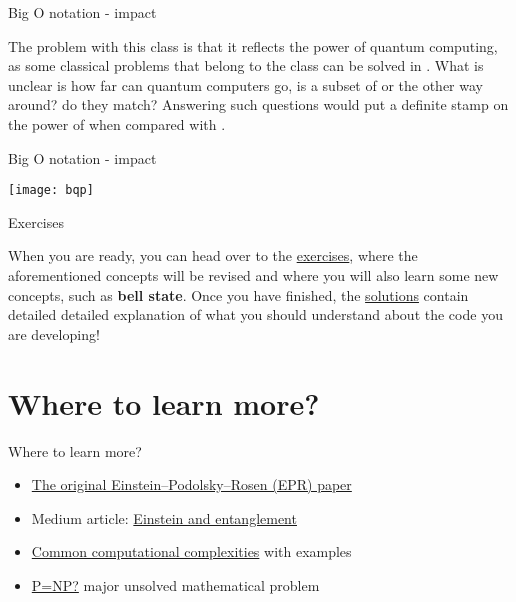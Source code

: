 \documentclass[aspectratio=43]{beamer}
\begin{document}
\begin{frame}{Big O notation - \q impact}
\begin{card}[NP vs BQP]
    The problem with this class is that it reflects the power of quantum computing, as some classical problems that belong to the \np class can be solved in \bqp. What is unclear is how far can quantum computers go, is \bqp a subset of \np or the other way around? do they match? Answering such questions would put a definite stamp on the power of \qc when compared with \cc.
\end{card}
\pagenumber
\end{frame}

\begin{frame}{Big O notation - \q impact}
\begin{center}
    \texttt{[image: bqp]}
\end{center}
\pagenumber
\end{frame}

\begin{frame}{Exercises}
\begin{card}
When you are ready, you can head over to the \href{\weekFour/exercises/w4_01.ipynb}{exercises}, where the aforementioned concepts will be revised and where you will also learn some new concepts, such as \textbf{bell state}. Once you have finished, the \href{\weekFour/exercises/w4_01_s.ipynb}{solutions} contain detailed detailed explanation of what you should understand about the code you are developing!
\end{card}
\pagenumber
\end{frame}

\section{Where to learn more?}
\begin{frame}{Where to learn more?}
\begin{card}
    \begin{itemize}
    \item \href{http://www.drchinese.com/David/EPR.pdf}{The original Einstein–Podolsky–Rosen (EPR) paper}
    \item Medium article: \href{https://medium.com/quantum1net/einstein-and-entanglement-8c9f12e7f47b}{Einstein and entanglement}
    \item \href{https://en.wikipedia.org/wiki/Big_O_notation#Orders_of_common_functions}{Common computational complexities} with examples
    \item \href{https://en.wikipedia.org/wiki/P_versus_NP_problem}{P=NP?} major unsolved mathematical problem
    \end{itemize}
\end{card}
\end{frame}
\end{document}
